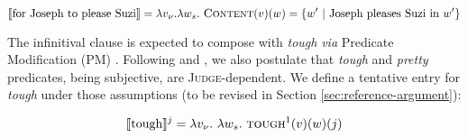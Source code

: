 \documentclass[11pt]{article}
\begin{document}
\begin{equation*}
	\llbracket \text{for Joseph to please Suzi} \rrbracket = \lambda v_\nu. \lambda w_s. \ \textsc{Content}(v)(w) = \lbrace w' \ | \  \text{Joseph pleases Suzi in } w' \rbrace
\end{equation*}

The infinitival clause is expected to compose with \textit{tough} \textit{via} Predicate Modification (PM) \cite{Moulton2015,Gluckman2021}. Following \cite{Pesetsky1987, Lasersohn2005} and \cite{Keine2017}, we also postulate that \textit{tough} and \textit{pretty} predicates, being subjective, are \textsc{Judge}-dependent. We define a tentative entry for \textit{tough} under those assumptions (to be revised in Section \ref{sec:reference-argument}):


\begin{equation*}
	\llbracket\text{tough}\rrbracket^j = \lambda v_\nu . \ \lambda w_s . \ \text{\textsc{tough\footnotemark}}(v)(w)(j)
\end{equation*}

\end{document}
